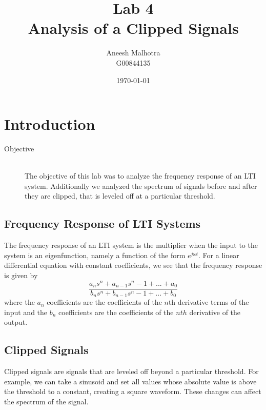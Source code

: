 \documentclass{article}
\title{Lab 4 \\ Analysis of a Clipped Signals} %
\author{Aneesh Malhotra \\ G00844135} %
\date{\today} %
\begin{document}
\maketitle %




\section{Introduction}



\begin{description}
\item[Objective] \hfill \\
The objective of this lab was to analyze the frequency response of an LTI system. Additionally we analyzed the spectrum of signals before and after they are clipped, that is leveled off at a particular threshold. 
\end{description}

\subsection{Frequency Response of LTI Systems}
The frequency response of an LTI system is the multiplier when the input to the system is an eigenfunction, namely a function of the form $e^{j \omega t}$. For a linear differential equation with constant coefficients, we see that the frequency response is given by $$\frac{a_n s^n + a_{n-1} s^n-1 + ... + a_0}{b_n s^n + b_{n-1} s^n-1 + ... + b_0}$$ where the $a_n$ coefficients are the coefficients of the $n$th derivative terms of the input and the $b_n$ coefficients are the coefficients of the $nth$ derivative of the output.
\subsection{Clipped Signals}
Clipped signals are signals that are leveled off beyond a particular threshold. For example, we can take a sinusoid and set all values whose absolute value is above the threshold to a constant, creating a square waveform. These changes can affect the spectrum of the signal. 
\end{document}
